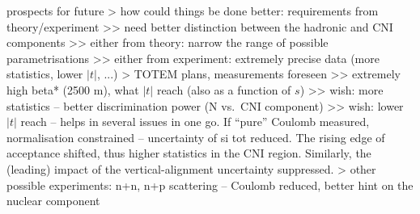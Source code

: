 \> prospects for future
\>> how could things be done better: requirements from theory/experiment
\>>> need better distinction between the hadronic and CNI components
\>>> either from theory: narrow the range of possible parametrisations
\>>> either from experiment: extremely precise data (more statistics, lower $|t|$, ...)
\>> TOTEM plans, measurements foreseen
\>>> extremely high beta* (2500 m), what $|t|$ reach (also as a function of $s$)
\>>> wish: more statistics -- better discrimination power (N vs.~CNI component)
\>>> wish: lower $|t|$ reach -- helps in several issues in one go. If ``pure'' Coulomb measured, normalisation constrained -- uncertainty of si tot reduced. The rising edge of acceptance shifted, thus higher statistics in the CNI region. Similarly, the (leading) impact of the vertical-alignment uncertainty suppressed.
\>> other possible experiments: n+n, n+p scattering -- Coulomb reduced, better hint on the nuclear component
